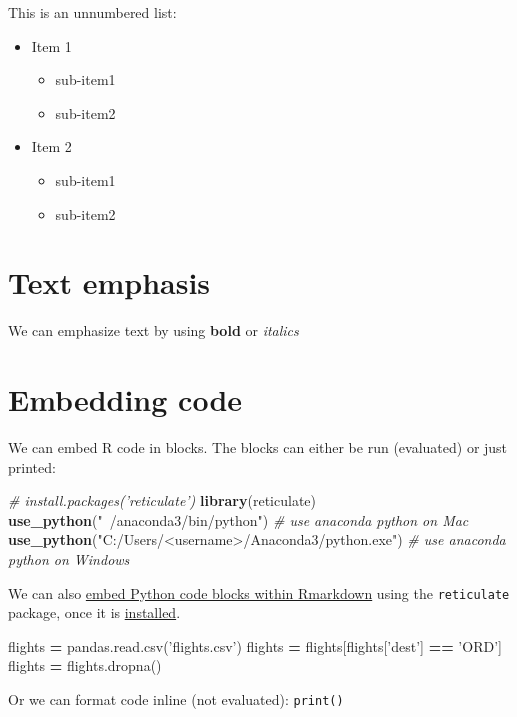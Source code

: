 \documentclass[]{book}
\newenvironment{Shaded}{\begin{snugshade}}{\end{snugshade}}
\newcommand{\KeywordTok}[1]{\textcolor[rgb]{0.13,0.29,0.53}{\textbf{#1}}}
\newcommand{\StringTok}[1]{\textcolor[rgb]{0.31,0.60,0.02}{#1}}
\newcommand{\CommentTok}[1]{\textcolor[rgb]{0.56,0.35,0.01}{\textit{#1}}}
\newcommand{\OperatorTok}[1]{\textcolor[rgb]{0.81,0.36,0.00}{\textbf{#1}}}
\newcommand{\NormalTok}[1]{#1}
\providecommand{\tightlist}{%
  \setlength{\itemsep}{0pt}\setlength{\parskip}{0pt}}
\begin{document}
This is an unnumbered list:

\begin{itemize}
\tightlist
\item
  Item 1

  \begin{itemize}
  \tightlist
  \item
    sub-item1
  \item
    sub-item2
  \end{itemize}
\item
  Item 2

  \begin{itemize}
  \tightlist
  \item
    sub-item1
  \item
    sub-item2
  \end{itemize}
\end{itemize}

\hypertarget{text-emphasis}{%
\section{Text emphasis}\label{text-emphasis}}

We can emphasize text by using \textbf{bold} or \emph{italics}

\hypertarget{embedding-code}{%
\section{Embedding code}\label{embedding-code}}

We can embed R code in blocks. The blocks can either be run (evaluated) or just printed:

\begin{Shaded}
\begin{Highlighting}[]
\CommentTok{# install.packages('reticulate')}
\KeywordTok{library}\NormalTok{(reticulate)}
\KeywordTok{use_python}\NormalTok{(}\StringTok{"~/anaconda3/bin/python"}\NormalTok{) }\CommentTok{# use anaconda python on Mac}
\KeywordTok{use_python}\NormalTok{(}\StringTok{"C:/Users/<username>/Anaconda3/python.exe"}\NormalTok{) }\CommentTok{# use anaconda python on Windows}
\end{Highlighting}
\end{Shaded}

We can also \href{https://rstudio.github.io/reticulate/articles/r_markdown.html}{embed Python code blocks within Rmarkdown} using the \texttt{reticulate} package, once it is \href{https://rstudio.github.io/reticulate/index.html}{installed}.

\begin{Shaded}
\begin{Highlighting}[]
\NormalTok{flights }\OperatorTok{=}\NormalTok{ pandas.read.csv(}\StringTok{'flights.csv'}\NormalTok{)}
\NormalTok{flights }\OperatorTok{=}\NormalTok{ flights[flights[}\StringTok{'dest'}\NormalTok{] }\OperatorTok{==} \StringTok{'ORD'}\NormalTok{]}
\NormalTok{flights }\OperatorTok{=}\NormalTok{ flights.dropna()}
\end{Highlighting}
\end{Shaded}

Or we can format code inline (not evaluated): \texttt{print()}
\end{document}
